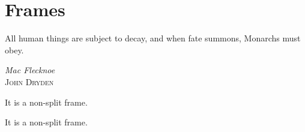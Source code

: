 \chapter{Frames}
\label{ch:ch2}

\epigraph{All human things are subject to decay, and when fate summons, Monarchs must obey.}{\textit{Mac Flecknoe} \\ \textsc{John Dryden}}

\begin{notice}
	It is a non-split frame.
\end{notice}

\begin{notice}
	\lipsum[6-7]
\end{notice}

\lipsum[8-9]

\begin{highlight}[Problem 1]
	It is a non-split frame.
\end{highlight}

\lipsum[10-11]

\begin{highlight}[Problem 2]
	\lipsum[12-13]
\end{highlight}

\begin{highlight*}[No Problem]
	\lipsum[14-15]
\end{highlight*}
